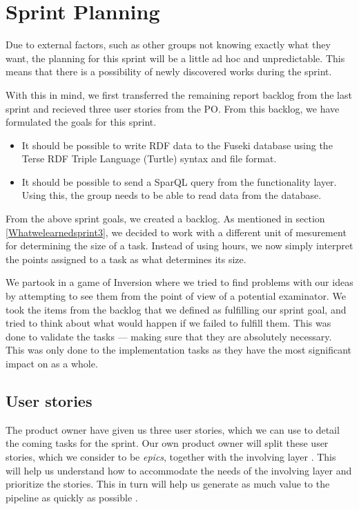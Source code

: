 \section{Sprint Planning}

Due to external factors, such as other groups not knowing exactly what they want, the planning for this sprint will be a little ad hoc and unpredictable.  
This means that there is a possibility of newly discovered works during the sprint.

With this in mind, we first transferred the remaining report backlog from the last sprint and recieved three user stories from the PO. 
From this backlog, we have formulated the goals for this sprint.

\begin{itemize}
    \item It should be possible to write RDF data to the Fuseki database using the Terse RDF Triple Language (Turtle) syntax and file format.
    \item It should be possible to send a SparQL query from the functionality layer. Using this, the group needs to be able to read data from the database.
\end{itemize}

From the above sprint goals, we created a backlog. As mentioned in section \ref{Whatwelearnedsprint3}, we decided to work with a different unit of mesurement for determining the size of a task.
Instead of using hours, we now simply interpret the points assigned to a task as what determines its size.

We partook in a game of Inversion  where we tried to find problems with our ideas by attempting to see them from the point of view of a potential examinator. 
We took the items from the backlog that we defined as fulfilling our sprint goal, and tried to think about what would happen if we failed to fulfill them. 
This was done to validate the tasks — making sure that they are absolutely necessary. 
This was only done to the implementation tasks as they have the most significant impact on \knox{} as a whole.

\subsection{User stories}
The \knox{} product owner have given us three user stories, which we can use to detail the coming tasks for the sprint.
Our own product owner will split these user stories, which we consider to be \textit{epics}, together with the involving layer \cite{Epics}.
This will help us understand how to accommodate the needs of the involving layer and prioritize the stories.
This in turn will help us generate as much value to the pipeline as quickly as possible \cite{UserStories}.

